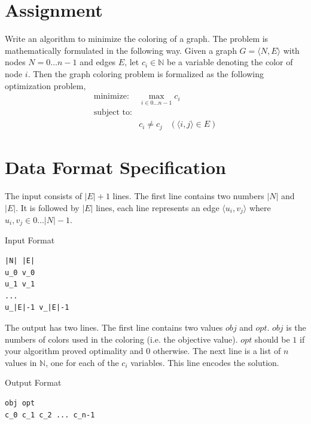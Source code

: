 \documentclass[11pt]{article}
\begin{document}
\section{Assignment}

Write an algorithm to minimize the coloring of a graph.  The problem is mathematically formulated in the following way.  Given a graph $G = \langle N, E \rangle$ with nodes $N = 0 \ldots n-1$ and edges $E$, let $c_i \in \mathbb{N}$ be a variable denoting the color of node $i$.  Then the graph coloring problem is formalized as the following optimization problem,
$$
\begin{array}{ll}
\mbox{minimize:} & \displaystyle \max_{i \in 0 \ldots n-1} c_i \\
\mbox{subject to:} & \\
     & c_i \neq c_j  \;\;\; (\langle i,j \rangle \in E)
\end{array}
$$

\section{Data Format Specification}

The input consists of $|E| + 1$ lines.  The first line contains two numbers $|N|$ and $|E|$.
It is followed by $|E|$ lines, each line represents an edge $\langle u_i, v_j \rangle$ where $u_i, v_j \in 0 \ldots |N|-1$.

\vspace{0.2cm}
\noindent
Input Format
\vspace{-0.2cm}
\begin{Verbatim}[frame=single]
|N| |E|
u_0 v_0
u_1 v_1
...
u_|E|-1 v_|E|-1
\end{Verbatim}
%
The output has two lines.  The first line contains two values $obj$ and $opt$.  $obj$ is the numbers of colors used in the coloring (i.e. the objective value).  $opt$ should be $1$ if your algorithm proved optimality and $0$ otherwise.  The next line is a list of $n$ values in $\mathbb{N}$, one for each of the $c_i$ variables.  This line encodes the solution.

\vspace{0.2cm}
\noindent
Output Format
\vspace{-0.2cm}
\begin{Verbatim}[frame=single]
obj opt
c_0 c_1 c_2 ... c_n-1
\end{Verbatim}
%
\end{document}
